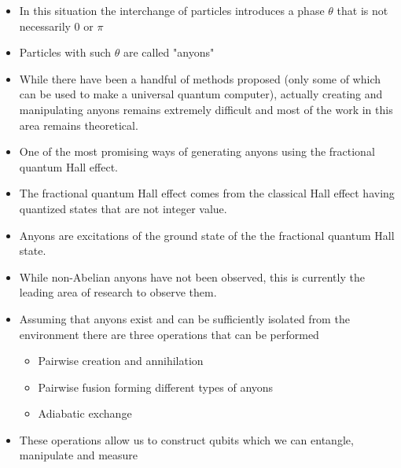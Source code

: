 \documentclass[20pt,,margin=1in,innermargin=-4.5in,blockverticalspace=-0.25in]{tikzposter}
\begin{document}
\begin{columns}
{\begin{itemize}
             \item In this situation the interchange of particles introduces a phase $\theta$ that is not necessarily $0$ or $\pi$
             \item Particles with such $\theta$ are called "anyons"
             \item While there have been a handful of methods proposed (only some of which can be used to make a universal quantum computer), actually creating and manipulating anyons remains extremely difficult and most of the work in this area remains theoretical.
             \item One of the most promising ways of generating anyons using the fractional quantum Hall effect.
             \item The fractional quantum Hall effect comes from the classical Hall effect having quantized states that are not integer value.
             \item Anyons are excitations of the ground state of the the fractional quantum Hall state.
             \item While non-Abelian anyons have not been observed, this is currently the leading area of research to observe them.
             \item Assuming that anyons exist and can be sufficiently isolated from the environment there are three operations that can be performed \cite{cite:1}
             \begin{itemize}
                 \item Pairwise creation and annihilation
                 \item Pairwise fusion forming different types of anyons
                 \item Adiabatic exchange
             \end{itemize}
             \item These operations allow us to construct qubits which we can entangle, manipulate and measure
         \end{itemize}
    }
   

\end{columns}
\end{document}
